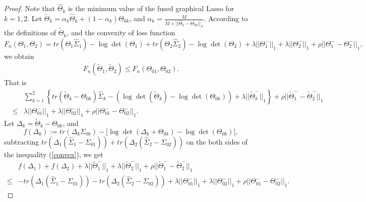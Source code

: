 \documentclass[review]{elsarticle}
\newcommand{\1}{{\bf 1}}
\newcommand{\0}{{\bf 0}}
\newcommand{\bqa}{\begin{eqnarray}}
\newcommand{\eqa}{\end{eqnarray}}
\newcommand{\non}{\nonumber\\}
\newtheorem{proof}{Proof}
\begin{document}
\begin{appendices}
\begin{proof}
 Note that $\widehat{\Theta}_k$ is the minimum value of the fused graphical Lasso for $k=1,2$.
 Let $\widetilde{\Theta}_k=\alpha_k\widehat{\Theta}_k+(1-\alpha_k)\Theta_{0k}$, and $\alpha_k=\frac{M}{M+||\widehat{\Theta}_k-\Theta_{0k}||_{F}}$. According to the definitions of $\widetilde{\Theta}_k$, and the convexity of loss function $$F_n(\Theta_1,\Theta_2)=tr(\Theta_1\widehat{\Sigma}_1)-\log\det(\Theta_1)
 +tr(\Theta_2\widehat{\Sigma}_2)-\log\det(\Theta_2)+\lambda||\Theta_1^{-}||_1+
 \lambda||\Theta_2^{-}||_1+\rho||\Theta_1^{-}-\Theta_2^{-}||_1,$$ we obtain
\bqa
F_n(\widetilde\Theta_1,\widetilde\Theta_2)\leq F_n(\Theta_{01},\Theta_{02}).
\eqa
 That is
\bqa\label{convex}
 &&\sum_{k=1}^{2}\left\{tr(\widetilde{\Theta}_k-\Theta_{0k})\widehat{\Sigma}_k-\left(\log \det(\widetilde{\Theta}_k)-\log\det(\Theta_{0k})\right)
+\lambda||\widetilde{\Theta}^{-}_k||_{1}\right\}
+\rho||\widetilde{\Theta}_1^{-}-\widetilde{\Theta}_2^{-}||_1\ \non
&\leq& \lambda||\Theta^{-}_{01}||_{1}+\lambda||\Theta^{-}_{02}||_{1}
+\rho||\Theta_{01}^{-}-\Theta_{02}^{-}||_1.
\eqa
 Let $\Delta_k=\widetilde{\Theta}_k-\Theta_{0k}$, and
\begin{equation*}
f(\Delta_k):=tr(\Delta_k\Sigma_{0k})-\Big[\log\det(\Delta_k+\Theta_{0k})-\log\det(\Theta_{0k})\Big],
\end{equation*}
 subtracting $tr(\Delta_1(\widehat{\Sigma}_1-\Sigma_{01}))
+tr(\Delta_2(\widehat{\Sigma}_2-\Sigma_{02}))$ on the both sides of the inequality (\ref{convex}), we get
\begin{equation}\label{equ12}
\begin{aligned}
&f(\Delta_1)+f(\Delta_2)+\lambda||\widetilde{\Theta}_1^{-}||_1+\lambda||\widetilde{\Theta}_2^{-}||_1
+\rho||\widetilde{\Theta}_1^{-}-\widetilde{\Theta}_2^{-}||_1\\
\leq &-tr(\Delta_1(\widehat{\Sigma}_1-\Sigma_{01}))
-tr(\Delta_2(\widehat{\Sigma}_2-\Sigma_{02}))+
\lambda||\Theta_{01}^{-}||_1+\lambda||\Theta_{02}^{-}||_1
+\rho||\Theta_{01}^{-}-\Theta_{02}^{-}||_1.
\end{aligned}
\end{equation}


\end{proof}
\end{appendices}
\end{document}
